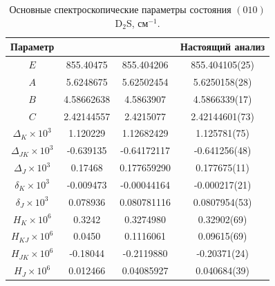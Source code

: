 \begin{table}[htbp]
\centering
\caption{Основные спектроскопические параметры состояния $(010)$ D$_2$S, см$^{-1}$.}
\label{tab:d2s_010_parameters}
\small
\begin{tabular}{|c|c|c|c|}
\hline
Параметр & \cite{d2s_gillis1985} & \cite{d2s_camy1988} & Настоящий анализ \\
\hline
$E$ & 855.40475 & 855.404206 & 855.404105(25) \\
$A$ & 5.6248675 & 5.62502454 & 5.6250158(28) \\
$B$ & 4.58662638 & 4.5863907 & 4.5866339(17) \\
$C$ & 2.42144557 & 2.4215077 & 2.42144601(73) \\
$\Delta_K\times10^3$ & 1.120229 & 1.12682429 & 1.125781(75) \\
$\Delta_{JK}\times10^3$ & -0.639135 & -0.64172117 & -0.641256(48) \\
$\Delta_J\times10^3$ & 0.17468 & 0.177659290 & 0.177675(11) \\
$\delta_K\times10^3$ & -0.009473 & -0.00044164 & -0.000217(21) \\
$\delta_J\times10^3$ & 0.078936 & 0.080781116 & 0.0807954(53) \\
$H_K\times10^6$ & 0.3242 & 0.3274980 & 0.32902(69) \\
$H_{KJ}\times10^6$ & 0.0450 & 0.1116061 & 0.09615(69) \\
$H_{JK}\times10^6$ & -0.18044 & -0.2119880 & -0.20371(24) \\
$H_J\times10^6$ & 0.012466 & 0.04085927 & 0.040684(39) \\
\hline
\end{tabular}
\end{table}
